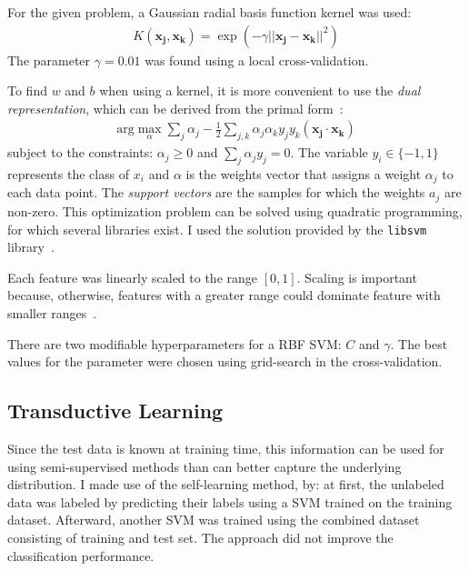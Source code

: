 \documentclass[a4paper]{article}
\begin{document}
For the given problem, a Gaussian radial basis function kernel was
used:
\begin{align}
K(\mathbf{x_j}, \mathbf{x_k}) = \exp(-\gamma||\mathbf{x_j} - \mathbf{x_k} ||^2)
\end{align}
The parameter $\gamma = 0.01$ was found using a local
cross-validation.

To find $w$ and $b$ when using a kernel, it is more convenient to use
the \emph{dual representation}, which can be derived from the primal
form~\cite{russell2003artificial}:
\begin{align}
\label{eq:dual}
\text{arg}\max_\alpha\sum_j\alpha_j - \frac{1}{2}\sum_{j,k}\alpha_j\alpha_ky_jy_k(\mathbf{x_j} \cdot \mathbf{x_k})
\end{align} subject to the constraints: $\alpha_j \geq 0$ and
$\sum_j\alpha_jy_j=0$. The variable $y_i \in \{-1, 1\}$ represents the
class of $x_i$ and $\alpha$ is the weights vector that assigns a weight
$\alpha_j$ to each data point. The \emph{support vectors} are the
samples for which the weights $a_j$ are non-zero. 
This optimization problem can be solved using
quadratic programming, for which several libraries
exist. I used the solution provided by the \texttt{libsvm} library~\cite{libsvm2011}.

Each feature was linearly scaled to the range $[0, 1]$. Scaling is
important because, otherwise, features with a greater range could
dominate feature with smaller ranges~\cite{hsu2003practical}.

There are two modifiable hyperparameters for a RBF SVM: $C$ and
$\gamma$. The best values for the parameter were chosen using
grid-search in the cross-validation.


\subsection{Transductive Learning}

Since the test data is known at training time, this information can be
used for using semi-supervised methods than can better capture the
underlying distribution. I made use of the self-learning method, by:
at first, the unlabeled data was labeled by predicting their labels
using a SVM trained on the training dataset. Afterward, another SVM
was trained using the combined dataset consisting of training and test
set. The approach did not improve the classification performance.

\end{document}
